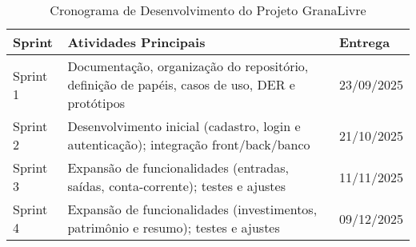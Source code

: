 \begin{table}[h!]
\centering
\caption{Cronograma de Desenvolvimento do Projeto GranaLivre}
\label{tab:cronograma}
\renewcommand{\arraystretch}{1.3}
\begin{tabular}{@{}p{3.2cm} p{7cm} p{2.5cm}@{}}
\toprule
\textbf{Sprint} & \textbf{Atividades Principais} & \textbf{Entrega} \\
\midrule
Sprint 1 & Documentação, organização do repositório, definição de papéis, casos de uso, DER e protótipos & 23/09/2025 \\
Sprint 2 & Desenvolvimento inicial (cadastro, login e autenticação); integração front/back/banco & 21/10/2025 \\
Sprint 3 & Expansão de funcionalidades (entradas, saídas, conta-corrente); testes e ajustes & 11/11/2025 \\
Sprint 4 & Expansão de funcionalidades (investimentos, patrimônio e resumo); testes e ajustes & 09/12/2025 \\
\bottomrule
\end{tabular}
\end{table}
